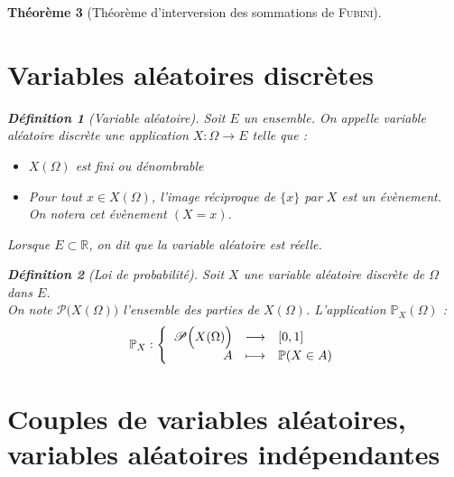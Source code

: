 \documentclass[11pt,a4paper]{report}
\newtheorem{theorem}{Théorème}[chapter]
\theoremstyle{definition}
\newtheorem{dfn}[theorem]{Définition}
\begin{document}
\begin{theorem}[Théorème d'interversion des sommations de \textsc{Fubini}]
{{\section{Variables aléatoires discrètes} %
\label{sec:variables_aleatoires_discretes}
\begin{dfn}[Variable aléatoire]
     Soit $E$ un ensemble. On appelle \emph{variable aléatoire} discrète une application $X : \Omega \to E$ telle que :
     \begin{itemize}
         \item $X(\Omega )$ est fini ou dénombrable
         \item Pour tout $x \in X(\Omega )$, l'image réciproque de $\lbrace x \rbrace$ par $X$ est un évènement. On notera cet évènement $(X= x)$.
     \end{itemize}
\end{dfn}
Lorsque $E\subset \ensuremath{\mathbb{R}}$, on dit que la variable aléatoire est réelle.
\begin{dfn}[Loi de probabilité]
     Soit $X$ une variable aléatoire discrète de $\Omega$ dans $E$.\\
     On note $\mathscr{P} \Big( X(\Omega ) \Big)$ l'ensemble des parties de $X(\Omega )$.
     L'application $\mathbb{P}_X (\Omega )$ : 
     \begin{equation}
      \mathbb{P}_X : \left\lbrace
      \begin{array}{r c l}
           \mathscr{P} \Big( X(\Omega ) \Big) &\longrightarrow & [0,1] \\
           A & \longmapsto & \mathbb{P} (X\in A)
      \end{array} \right.
      \end{equation}
\end{dfn}

\section[Couples de variables aléatoires]{Couples de variables aléatoires, variables aléatoires indépendantes} %
\label{sec:couples_de_variables_aleatoires}

}}
\end{theorem}
\end{document}
